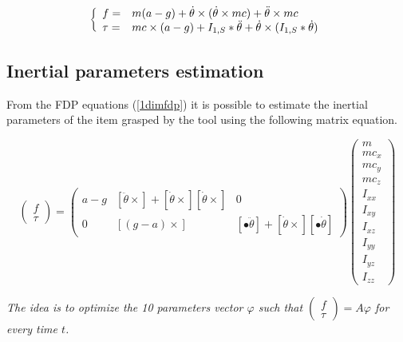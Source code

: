 \documentclass[\main/main.tex]{subfiles}
\begin{document}
\begin{equation}
 \label{1dimfdp}
 \left \{
 \begin{array}{l l}
  f =    & m (a - g) + \dot{\theta} \times (\dot{\theta} \times m c) + \ddot{\theta} \times m c \\
  \tau = & m c \times (a - g)
  + I_{1, S} \ast \ddot{\theta} + \dot{\theta} \times (I_{1, S} \ast \dot{\theta})
 \end{array}
 \right.
\end{equation}

\subsection{Inertial parameters estimation}
\label{olinpe}

From the FDP equations (\ref{1dimfdp}) it is possible to estimate the inertial parameters of the item grasped by the tool using the following matrix equation.

\begin{equation}
 \begin{pmatrix}
  f    \\
  \tau
 \end{pmatrix}
 =
 \begin{pmatrix}
  a - g & \left[ \ddot{\theta} \times \right] +  \left[ \dot{\theta} \times \right] \left[ \dot{\theta} \times \right] & 0                                                                                                             \\
  0     & \left[ (g - a) \times \right]                                                                                & \left[ \bullet \ddot{\theta} \right] + \left[ \dot{\theta} \times \right] \left[ \bullet \dot{\theta} \right]
 \end{pmatrix}
 \begin{pmatrix}
  m      \\
  m c_x  \\
  m c_y  \\
  m c_z  \\
  I_{xx} \\
  I_{xy} \\
  I_{xz} \\
  I_{yy} \\
  I_{yz} \\
  I_{zz}
 \end{pmatrix}
\end{equation}

{\it
 The idea is to optimize the 10 parameters vector $\varphi$ such that $
 \begin{pmatrix}
  f    \\
  \tau
 \end{pmatrix} = A \varphi$
 for every time $t$.
}
\end{document}
